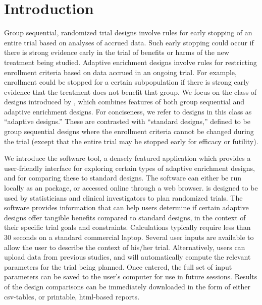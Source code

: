 \documentclass[article]{jss}
\begin{document}
\section*{Introduction} \label{sec:intro}
Group sequential, randomized trial designs involve rules for early stopping of an entire trial based on analyses of accrued data. Such early stopping could occur if there is strong evidence early in the trial of benefits or harms of the new treatment being studied. Adaptive enrichment designs involve rules for restricting enrollment criteria based on data accrued in an ongoing trial. For example, enrollment could be stopped for a certain subpopulation if there is strong early evidence that the treatment does not benefit that group.
We focus on the  class of designs introduced by \cite{Rosenblum2013AdaptMISTIE}, which combines features of both group sequential and adaptive enrichment designs. For conciseness, we refer to designs in this class as  ``adaptive designs.''
These are contrasted with ``standard designs,'' 
defined to  be group sequential designs where the enrollment criteria cannot be changed during the trial (except that the entire trial may be stopped early for efficacy or futility). 

We introduce the  software tool, a densely featured  application which provides a user-friendly interface for exploring certain types of adaptive enrichment designs, and for comparing these to standard designs. %
The software can either be run locally as an  package, or accessed online through a web browser. 
 is designed to be used by statisticians and clinical investigators to plan randomized trials. The software provides information that can help users determine if certain adaptive designs offer tangible benefits compared to standard designs, in the context of their specific trial goals and constraints. Calculations typically require less than 30 seconds on a standard commercial laptop. Several user inputs are available to allow the user to describe the context of his/her trial. Alternatively, users can upload data from previous studies, and  will automatically compute the relevant parameters for the trial being planned. Once entered, the full set of input parameters can be saved to the user's computer for use in future sessions. Results of the design comparisons can be immediately downloaded in the form of either csv-tables, or printable, html-based reports.
\end{document}
